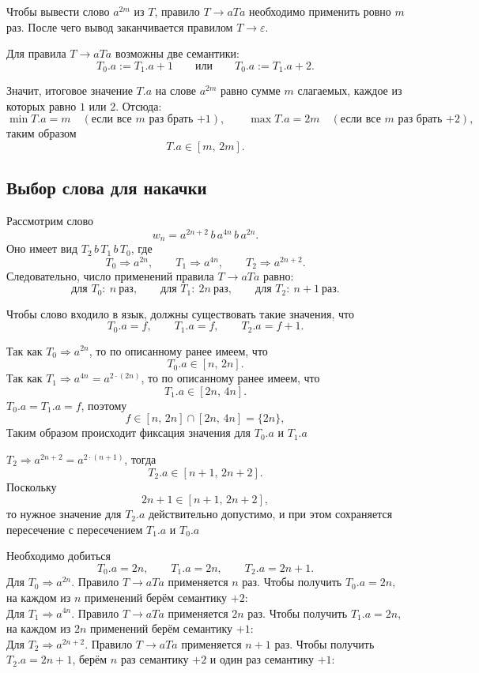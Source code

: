 \documentclass[12pt,a4paper]{article}
\begin{document}
Чтобы вывести слово $a^{2m}$ из $T$, правило $T\to aTa$ необходимо применить ровно $m$ раз. После чего вывод заканчивается правилом $T\to \varepsilon$.

Для правила $T\to aTa$ возможны две семантики:
\[
T_0.a := T_1.a + 1
\qquad \text{или} \qquad
T_0.a := T_1.a + 2.
\]

Значит, итоговое значение $T.a$ на слове $a^{2m}$ равно сумме $m$ слагаемых, каждое из которых равно $1$ или $2$. Отсюда:
\[
\min T.a = m \quad (\text{если все $m$ раз брать $+1$}), \qquad
\max T.a = 2m \quad (\text{если все $m$ раз брать $+2$}),
\]
таким образом
\[
T.a \in [m,\,2m].
\]

\subsection*{Выбор слова для накачки}
Рассмотрим слово
\[
w_n = a^{2n+2}\,b\,a^{4n}\,b\,a^{2n}.
\]
Оно имеет вид $T_2\,b\,T_1\,b\,T_0$, где
\[
T_0 \Rightarrow a^{2n},\qquad
T_1 \Rightarrow a^{4n},\qquad
T_2 \Rightarrow a^{2n+2}.
\]
Следовательно, число применений правила $T\to aTa$ равно:
\[
\text{для }T_0:\ n\ \text{раз},\qquad
\text{для }T_1:\ 2n\ \text{раз},\qquad
\text{для }T_2:\ n+1\ \text{раз}.
\]

Чтобы слово входило в язык, должны существовать такие значения, что
\[
T_0.a=f,\qquad T_1.a=f,\qquad T_2.a=f+1.
\]

Так как $T_0\Rightarrow a^{2n}$, то по описанному ранее имеем, что
\[
T_0.a \in [n,\,2n].
\]
Так как $T_1\Rightarrow a^{4n}=a^{2\cdot(2n)}$, то по описанному ранее имеем, что
\[
T_1.a \in [2n,\,4n].
\]
$T_0.a=T_1.a=f$, поэтому
\[
f\in [n,\,2n]\cap[2n,\,4n]=\{2n\},
\]
Таким образом происходит фиксация значения для $T_0.a$ и $T_1.a$

$T_2 \Rightarrow a^{2n+2}=a^{2\cdot(n+1)}$, тогда
\[
T_2.a \in [n+1,\,2n+2].
\]
Поскольку
\[
2n+1 \in [n+1,\,2n+2],
\]
то нужное значение для $T_2.a$ действительно допустимо, и при этом сохраняется пересечение с пересечением $T_1.a$ и $T_0.a$

Необходимо добиться
\[
T_0.a=2n,\qquad T_1.a=2n,\qquad T_2.a=2n+1.
\]
Для $T_0\Rightarrow a^{2n}$.
Правило $T\to aTa$ применяется $n$ раз.
Чтобы получить $T_0.a=2n$, на каждом из $n$ применений берём семантику $+2$:\\
Для $T_1\Rightarrow a^{4n}$.
Правило $T\to aTa$ применяется $2n$ раз.
Чтобы получить $T_1.a=2n$, на каждом из $2n$ применений берём семантику $+1$:\\
Для $T_2\Rightarrow a^{2n+2}$.
Правило $T\to aTa$ применяется $n+1$ раз.
Чтобы получить $T_2.a=2n+1$, берём $n$ раз семантику $+2$ и один раз семантику $+1$:\\
\end{document}
